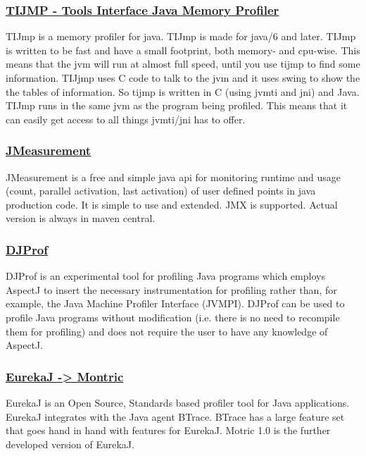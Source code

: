 \subsubsection{\href{http://www.khelekore.org/jmp/tijmp/}{TIJMP - Tools Interface Java Memory Profiler}}

TIJmp is a memory profiler for java. TIJmp is made for java/6 and later. TIJmp is written to be fast and have a small footprint, both memory- and cpu-wise. This means that the jvm will run at almost full speed, until you use tijmp to find some information. TIJjmp uses C code to talk to the jvm and it uses swing to show the the tables of information. So tijmp is written in C (using jvmti and jni) and Java. TIJmp runs in the same jvm as the program being profiled. This means that it can easily get access to all things jvmti/jni has to offer.


\subsubsection{\href{https://sourceforge.net/projects/jmeasurement2/}{JMeasurement}}

JMeasurement is a free and simple java api for monitoring runtime and usage (count, parallel activation, last activation) of user defined points in java production code. It is simple to use and extended. JMX is supported. Actual version is always in maven central.


\subsubsection{\href{http://homepages.mcs.vuw.ac.nz/~djp/djprof/}{DJProf}}

DJProf is an experimental tool for profiling Java programs which employs AspectJ to insert the necessary instrumentation for profiling rather than, for example, the Java Machine Profiler Interface (JVMPI). DJProf can be used to profile Java programs without modification (i.e. there is no need to recompile them for profiling) and does not require the user to have any knowledge of AspectJ.


\subsubsection{\href{https://github.com/joachimhs/Montric}{EurekaJ -> Montric}}

EurekaJ is an Open Source, Standards based profiler tool for Java applications. EurekaJ integrates with the Java agent BTrace. BTrace has a large feature set that goes hand in hand with features for EurekaJ. Motric 1.0 is the further developed version of EurekaJ.


